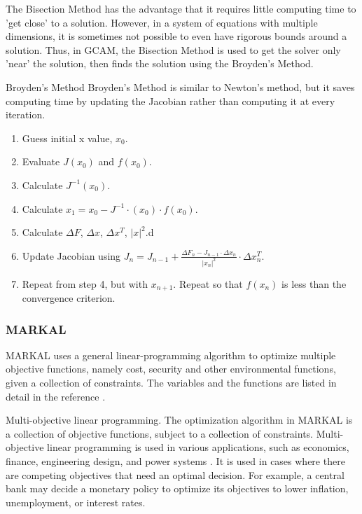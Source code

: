 The Bisection Method has the advantage that it requires little computing time
to 'get close' to a solution. However, in a system of equations with multiple
dimensions, it is sometimes not possible to even have rigorous bounds around 
a solution. Thus, in \gls{GCAM}, the Bisection Method is used to get the 
solver only 'near' the solution, then finds the solution using the Broyden's Method.

Broyden's Method
Broyden's Method is similar to Newton's method, but it saves computing 
time by updating the Jacobian rather than computing it at every iteration. 

\begin{enumerate}
\item Guess initial x value, $x_0$.
\item Evaluate $J(x_0)$ and $f(x_0)$.
\item Calculate $J^{-1}(x_0).$
\item Calculate $x_1 = x_0-J^{-1} \cdot (x_0) \cdot f(x_0)$.
\item Calculate $\Delta F$, $\Delta x$, $\Delta x^T$, $|x|^2$.d
\item Update Jacobian using $J_n = J_{n-1}+ \frac{\Delta F_n - J_{n-1} \cdot \Delta
	 x_n}{|x_n|^2} \cdot \Delta x_n^T $.
\item Repeat from step 4, but with $x_{n+1}$. Repeat so that $f(x_n)$ is less than the 
convergence criterion.
\end{enumerate}

\subsubsection{\gls{MARKAL}}

\gls{MARKAL} uses a general linear-programming algorithm to 
optimize multiple objective functions, namely cost, security and
other environmental functions, given a collection of constraints.
The variables and the functions are listed in detail in the reference
\cite{Markal_1981} \cite{User's_1979}. 

Multi-objective linear programming.
The optimization algorithm in \gls{MARKAL} is a collection
of objective functions, subject to a collection of constraints.
Multi-objective linear programming is used in various applications,
such as economics, finance, engineering design, and power systems
\cite{dorfman_linear_1958}.
It is used in cases where there are competing objectives that need
an optimal decision. For example, a central bank may decide a monetary 
policy to optimize its objectives to lower inflation, unemployment, 
or interest rates. 
 
